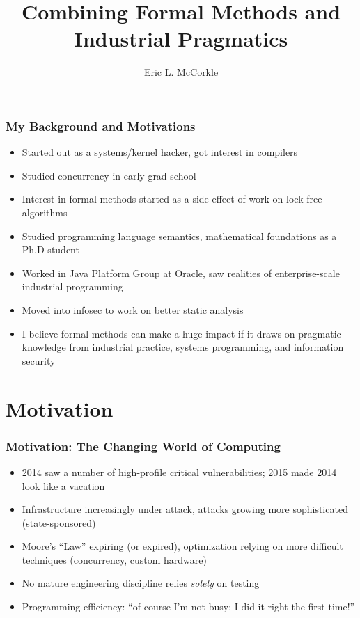 \documentclass{beamer}
\title{Combining Formal Methods and Industrial Pragmatics}
\author{Eric L. McCorkle}
\begin{document}
\begin{frame}
  \titlepage
\end{frame}

\begin{frame}
  \frametitle{My Background and Motivations}
  \begin{itemize}
    \item Started out as a systems/kernel hacker, got interest in
      compilers
    \item Studied concurrency in early grad school
    \item Interest in formal methods started as a side-effect of work on
      lock-free algorithms
    \item Studied programming language semantics, mathematical
      foundations as a Ph.D student
    \item Worked in Java Platform Group at Oracle, saw realities of
      enterprise-scale industrial programming
    \item Moved into infosec to work on better static analysis
    \item I believe formal methods can make a huge impact if it draws
      on pragmatic knowledge from industrial practice, systems
      programming, and information security
  \end{itemize}
\end{frame}

\section{Motivation}

\begin{frame}
  \frametitle{Motivation: The Changing World of Computing}
  \begin{itemize}
    \item 2014 saw a number of high-profile critical vulnerabilities;
      2015 made 2014 look like a vacation
    \item Infrastructure increasingly under attack, attacks growing
      more sophisticated (state-sponsored)
    \item Moore's ``Law'' expiring (or expired), optimization relying
      on more difficult techniques (concurrency, custom hardware)
    \item No mature engineering discipline relies \emph{solely} on testing
    \item Programming efficiency: ``of course I'm not busy; I did it
      right the first time!''
  \end{itemize}
\end{frame}
\end{document}
